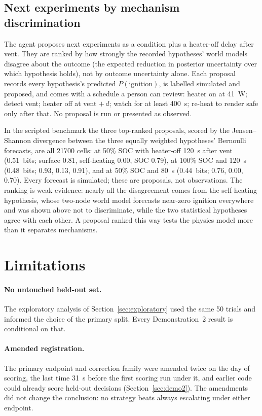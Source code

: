 \documentclass[11pt]{article}
\begin{document}
\subsection{Next experiments by mechanism discrimination}
The agent proposes next experiments as a condition plus a heater-off delay after vent. They are ranked by how
strongly the recorded hypotheses' world models disagree about the outcome (the expected reduction in posterior
uncertainty over which hypothesis holds), not by outcome uncertainty alone. Each proposal records every hypothesis's
predicted $P(\text{ignition})$, is labelled simulated and proposed, and comes with a schedule a person can review:
heater on at 41~W; detect vent; heater off at vent $+\,d$; watch for at least 400~s; re-heat to render safe only after
that. No proposal is run or presented as observed.

In the scripted benchmark the three top-ranked proposals, scored by the Jensen--Shannon divergence between the three
equally weighted hypotheses' Bernoulli forecasts, are all 21700 cells: at 50\% SOC with heater-off 120~s after vent
(0.51~bits; surface 0.81, self-heating 0.00, SOC 0.79), at 100\% SOC and 120~s (0.48~bits; 0.93, 0.13, 0.91), and at
50\% SOC and 80~s (0.44~bits; 0.76, 0.00, 0.70). Every forecast is simulated; these are proposals, not observations. The ranking is weak evidence: nearly all the disagreement comes from the
self-heating hypothesis, whose two-node world model forecasts near-zero ignition everywhere and was shown above not to
discriminate, while the two statistical hypotheses agree with each other. A proposal ranked this way tests the
physics model more than it separates mechanisms.

\section{Limitations}\label{sec:limits}

\paragraph{No untouched held-out set.} The exploratory analysis of Section~\ref{sec:exploratory} used the same 50
trials and informed the choice of the primary split. Every Demonstration~2 result is conditional on that.

\paragraph{Amended registration.} The primary endpoint and correction family were amended twice on the day of
scoring, the last time 31~s before the first scoring run under it, and earlier code could already score held-out
decisions (Section~\ref{sec:demo2}). The amendments did not change the conclusion: no strategy beats always
escalating under either endpoint.
\end{document}

